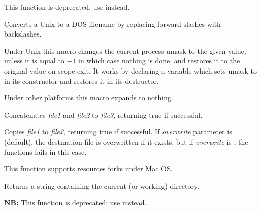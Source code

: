 \label{wxunix2dosfilename}


This function is deprecated, use  instead.

Converts a Unix to a DOS filename by replacing forward
slashes with backslashes.


\label{wxchangeumask}


Under Unix this macro changes the current process umask to the given value,
unless it is equal to $-1$ in which case nothing is done, and restores it to
the original value on scope exit. It works by declaring a variable which sets
umask to  in its constructor and restores it in its destructor.

Under other platforms this macro expands to nothing.


\label{wxconcatfiles}


Concatenates {\it file1} and {\it file2} to {\it file3}, returning
true if successful.


\label{wxcopyfile}


Copies {\it file1} to {\it file2}, returning true if successful. If
{\it overwrite} parameter is \true (default), the destination file is overwritten
if it exists, but if {\it overwrite} is \false, the functions fails in this
case.

This function supports resources forks under Mac OS.


\label{wxgetcwd}


Returns a string containing the current (or working) directory.


\label{wxgetworkingdirectory}


{\bf NB:} This function is deprecated: use  instead.

